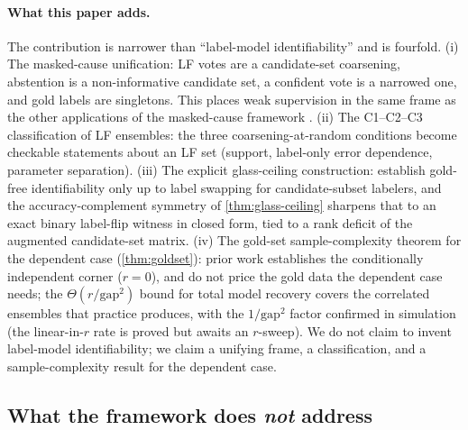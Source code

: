 \paragraph{What this paper adds.} The contribution is narrower than
``label-model identifiability'' and is fourfold. (i) The masked-cause
unification: LF votes are a candidate-set coarsening, abstention is a
non-informative candidate set, a confident vote is a narrowed one,
and gold labels are singletons. This places weak supervision in the
same frame as the other applications of the masked-cause framework
\citep{towell2026masked}. (ii) The C1--C2--C3 classification of LF
ensembles: the three coarsening-at-random conditions become checkable
statements about an LF set (support, label-only error dependence,
parameter separation). (iii) The explicit glass-ceiling construction:
\citet{yu2022nplm} establish gold-free identifiability only up to
label swapping for candidate-subset labelers, and the
accuracy-complement symmetry of \cref{thm:glass-ceiling} sharpens that
to an exact binary label-flip witness in closed form, tied to a rank
deficit of the augmented candidate-set matrix. (iv) The gold-set
sample-complexity theorem for the dependent case
(\cref{thm:goldset}): prior work establishes the conditionally
independent corner ($r = 0$), and \citet{yu2022nplm} do not price the
gold data the dependent case needs; the $\Theta(r / \mathrm{gap}^2)$
bound for total model recovery covers the correlated ensembles that
practice produces, with the $1/\mathrm{gap}^2$ factor confirmed in
simulation (the linear-in-$r$ rate is proved but awaits an $r$-sweep).
We do not
claim to invent label-model identifiability; we claim a unifying
frame, a classification, and a sample-complexity result for the
dependent case.

\subsection{What the framework does \emph{not} address}

